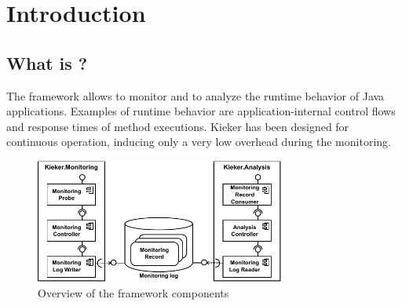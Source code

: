 % 


\chapter{Introduction}


\section{What is \Kieker?}\label{sec:kieker}

The \Kieker{} framework allows to monitor and to analyze the runtime behavior %
of Java applications. Examples of runtime behavior are application-internal %
control flows and response times of method executions. %
Kieker has been designed for continuous operation, inducing only a very low %
overhead during the monitoring. 

\begin{figure}[H]\centering
\includegraphics[width=0.73\textwidth]{images/kiekerComponentDiagram-woCloud-bw-w-record-newNames}
\caption{Overview of the framework components}
\label{Figure:KiekerComponentDiagram}
\end{figure}
		
